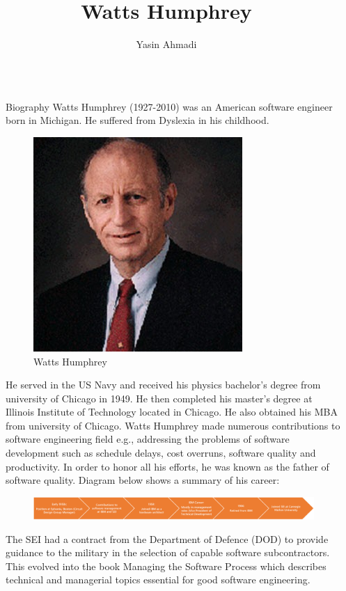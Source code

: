 \documentclass[final]{beamer}
\title{Watts Humphrey}
\author{Yasin Ahmadi}
\institute[shortinst]{KNTU}
\newlength{\sepwidth}
\newlength{\colwidth}
\newcommand{\separatorcolumn}{\begin{column}{\sepwidth}\end{column}}
\begin{document}
\begin{frame}[t]
\begin{columns}[t]
\separatorcolumn
\begin{column}{\colwidth}
  \begin{block}{Biography}
	Watts Humphrey (1927-2010) was an American software engineer born in Michigan. He suffered from Dyslexia in his childhood.
	\begin{figure}
		\centering
		\includegraphics[scale=2.7]{images/WattsHumphrey.png}
		\caption{Watts Humphrey}
	\end{figure}
	He served in the US Navy and received his physics bachelor’s degree from university of Chicago in 1949. He then completed his master’s degree at Illinois Institute of Technology located in Chicago. He also obtained his MBA from university of Chicago.
  	Watts Humphrey made numerous contributions to software engineering field e.g., addressing the problems of software development such as schedule delays, cost overruns, software quality and productivity. In order to honor all his efforts, he was known as the father of software quality. Diagram below shows a summary of his career:
  	\begin{figure}[h]
  		\centering
 		\includegraphics[scale=0.95]{images/Diag1.png}
  	\end{figure}
  	The SEI had a contract from the Department of Defence (DOD) to provide guidance to the military in the selection of capable software subcontractors. This evolved into the book Managing the Software Process\cite{humphrey1989managing} which describes technical and managerial topics essential for good software engineering.\\

\end{block}
\end{column}
\end{columns}
\end{frame}
\end{document}
